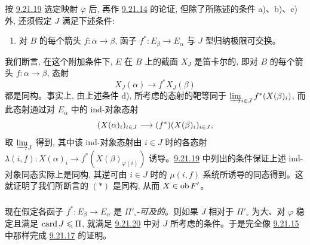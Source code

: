 \setcounter{subsection}{21} \setcounter{subsubsection}{19}


\subsubsection{}
按 \hyperref[I.lem9.21.19]{9.21.19} 选定映射 $\varphi$ 后, 再作 \hyperref[I.sec9.21.14]{9.21.14} 的论证, 但除了所陈述的条件 a)、b)、c) 外, 还须假定 $J$ 满足下述条件:
\begin{enumerate}
\renewcommand{\theenumi}{\alph{enumi}}
\renewcommand{\labelenumi}{\theenumi)}
\setcounter{enumi}{3}
\item 对 $B$ 的每个箭头 $f:\alpha\rightarrow \beta$, 函子 $f^\ast:E_{\beta}\rightarrow E_{\alpha}$ 与 $J$ 型归纳极限可交换。
\end{enumerate}

我们\pageoriginale 断言, 在这个附加条件下, $E$ 在 $B$ 上的截面 $X_J$ 是笛卡尔的, 即对 $B$ 的每个箭头 $f:\alpha\rightarrow \beta$, 态射
\begin{equation}
X_J(\alpha)\longrightarrow f^\ast X_J(\beta)\tag{$\ast$}
\end{equation}
都是同构。事实上, 由上述条件 d), 所考虑的态射的靶等同于 $\varinjlim_{i\in J}f^\ast(X(\beta)_i)$, 而此态射通过对 $E_{\alpha}$ 中的 ind-对象态射
$$
(X(\alpha)_i)_{i\in J}\longrightarrow (f^\ast)(X(\beta)_i)_{i\in
J}{},
$$
取 $\varinjlim_J$ 得到, 其中该 ind-对象态射由 $i\in J$ 时的各态射 $\lambda(i,f):X(\alpha)_i\rightarrow
f^\ast(X(\beta)_{\varphi(i)})$ 诱导。\hyperref[I.lem9.21.19]{9.21.19} 中列出的条件保证上述 ind-对象同态实际上是同构, 其逆可由 $i\in J$ 时的 $\mu(i,f)$ 系统所诱导的同态得到。这就证明了我们所断言的 $(\ast)$ 是同构, 从而 $X\in \operatorname{ob} F'$。

\subsubsection{}
现在假定各函子 $f^\ast:E_{\beta}\rightarrow E_{\alpha}$ 是 $\Pi'_{\circ}$-\emph{可及的}。则如果 $J$ 相对于 $\Pi'_{\circ}$ 为大、对 $\varphi$ 稳定且满足 $\operatorname{card} J\leqslant \Pi$, 就满足 \hyperref[I.sec9.21.20]{9.21.20} 中对 $J$ 所考虑的条件。于是完全像 \hyperref[I.sec9.21.15]{9.21.15} 中那样完成 \hyperref[I.lem9.21.17]{9.21.17} 的证明。

